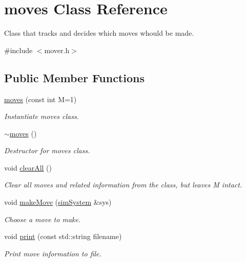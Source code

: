 \hypertarget{classmoves}{\section{moves Class Reference}
\label{classmoves}
}


Class that tracks and decides which moves whould be made.  




{\ttfamily \#include $<$mover.\-h$>$}

\subsection*{Public Member Functions}
\begin{DoxyCompactItemize}
\item 
\hyperlink{classmoves_a1964259b17a057e8b363736e42fca3e8}{moves} (const int M=1)
\begin{DoxyCompactList}\small\item\em Instantiate moves class. \end{DoxyCompactList}\item 
\hyperlink{classmoves_a00dfff19abe056adceb0ccf41778ee0f}{$\sim$moves} ()
\begin{DoxyCompactList}\small\item\em Destructor for moves class. \end{DoxyCompactList}\item 
void \hyperlink{classmoves_a3695f6a6d0128e2d0d76702f718accf8}{clear\-All} ()
\begin{DoxyCompactList}\small\item\em Clear all moves and related information from the class, but leaves M intact. \end{DoxyCompactList}\item 
void \hyperlink{classmoves_a7f023913b80bb62604b99f4dbf005c37}{make\-Move} (\hyperlink{classsim_system}{sim\-System} \&sys)
\begin{DoxyCompactList}\small\item\em Choose a move to make. \end{DoxyCompactList}\item 
void \hyperlink{classmoves_acc6415d4000f01b93235d1a533aa6880}{print} (const std\-::string filename)
\begin{DoxyCompactList}\small\item\em Print move information to file. \end{DoxyCompactList}\item 

\end{DoxyCompactItemize}
